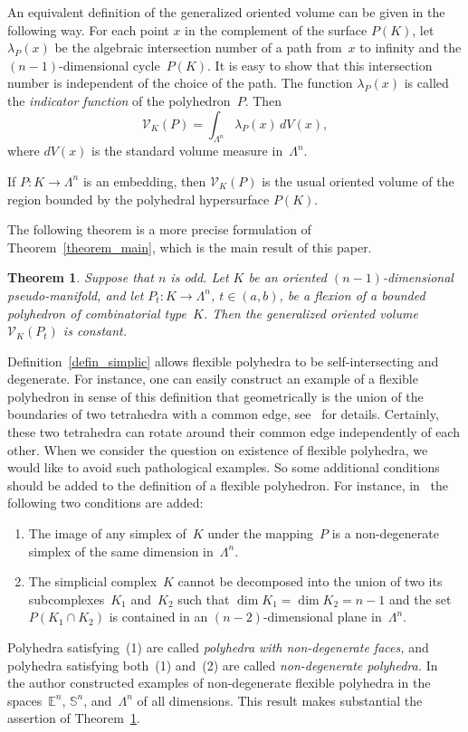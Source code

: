 \documentclass[reqno,tbtags,12pt]{amsart}
\numberwithin{equation}{section}
\newcommand{\E}{\mathbb{E}}
\newcommand{\bS}{\mathbb{S}}
\newcommand{\CV}{\mathcal{V}}
\newtheorem{theorem}{Theorem}[section]
\theoremstyle{definition}
\begin{document}
An equivalent definition of the generalized oriented volume can be given in the following way. For each point $x$ in the complement of the surface $ P(K)$, let $\lambda_P(x)$ be the algebraic intersection number of a path from~$x$ to infinity and  the $(n-1)$-dimensional cycle~$P(K)$. It is easy to show that this intersection number is independent of the choice of the path. The function $\lambda_P(x)$ is called the \textit{indicator function\/} of the polyhedron~$P$.
Then 
\begin{equation}\label{eq_gen_vol2}
\CV_K( P)=\int_{\Lambda^n}\lambda_P(x)\,d V(x),
\end{equation}
where $dV(x)$ is the standard volume measure in~$\Lambda^n$.

If $ P\colon K\to \Lambda^n$ is an embedding, then $\CV_K( P)$ is the usual oriented volume of the region bounded by the polyhedral hypersurface $ P(K)$. 

The following theorem is a more precise formulation of Theorem~\ref{theorem_main}, which is the main result of this paper.

\begin{theorem}\label{theorem_main2}
Suppose that $n$ is odd. Let $K$ be an oriented $(n-1)$-dimensional pseudo-manifold, and let $P_t\colon K\to\Lambda^n$, $t\in(a,b)$, be a flexion of a bounded polyhedron of combinatorial type~$K$. Then the generalized oriented volume $\CV_K(P_t)$ is constant.
\end{theorem}






Definition~\ref{defin_simplic} allows flexible polyhedra to be self-intersecting and degenerate. For instance, one can easily construct an example of a flexible polyhedron in sense of this definition that geometrically is the union of the boundaries of two tetrahedra with a common edge, see~\cite[Sect.~2]{Gai15} for details. Certainly, these two tetrahedra can rotate around their common edge independently of each other. When we consider the question on existence of flexible polyhedra, we would like to avoid such pathological examples. So some additional conditions should be added to the definition of a flexible polyhedron. For instance,  in~\cite{Gai15} the following two conditions are added:
\begin{enumerate}
\item The image of any simplex of~$K$ under the mapping~$P$ is a non-degenerate simplex of the same dimension in~$\Lambda^n$.
\item The simplicial complex~$K$ cannot be decomposed into the union of two its subcomplexes~$K_1$ and~$K_2$ such that $\dim K_1= \dim K_2=n-1$ and the set $P(K_1\cap K_2)$ is contained in an $(n-2)$-dimensional plane in~$\Lambda^n$. 
\end{enumerate}
Polyhedra satisfying~(1) are called \textit{polyhedra with non-degenerate faces,} and polyhedra satisfying both~(1) and~(2) are called \textit{non-degenerate polyhedra.}  In~\cite{Gai13} the author constructed examples of non-degenerate flexible polyhedra in the spaces~$\E^n$, $\bS^n$, and~$\Lambda^n$ of all dimensions. This result makes substantial the assertion of Theorem~\ref{theorem_main2}.
\end{document}
